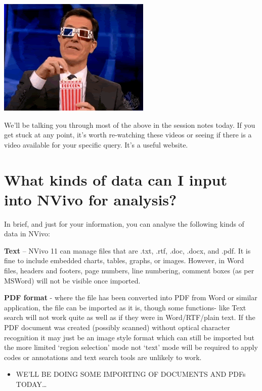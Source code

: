 \documentclass[
]{book}
\providecommand{\tightlist}{%
  \setlength{\itemsep}{0pt}\setlength{\parskip}{0pt}}
\begin{document}
\includegraphics{imgs/popcorn.gif}

We'll be talking you through most of the above in the session notes today. If you get stuck at any point, it's worth re-watching these videos or seeing if there is a video available for your specific query. It's a useful website.

\hypertarget{what-kinds-of-data-can-i-input-into-nvivo-for-analysis}{%
\section{What kinds of data can I input into NVivo for analysis?}\label{what-kinds-of-data-can-i-input-into-nvivo-for-analysis}}

In brief, and just for your information, you can analyse the following kinds of data in NVivo:

\textbf{Text} -- NVivo 11 can manage files that are .txt, .rtf, .doc, .docx, and .pdf. It is fine to include embedded charts, tables, graphs, or images. However, in Word files, headers and footers, page numbers, line numbering, comment boxes (as per MSWord) will not be visible once imported.

\textbf{PDF format} - where the file has been converted into PDF from Word or similar application, the file can be imported as it is, though some functions- like Text search will not work quite as well as if they were in Word/RTF/plain text. If the PDF document was created (possibly scanned) without optical character recognition it may just be an image style format which can still be imported but the more limited `region selection' mode not `text' mode will be required to apply codes or annotations and text search tools are unlikely to work.

\begin{itemize}
\tightlist
\item
  WE'LL BE DOING SOME IMPORTING OF DOCUMENTS AND PDFs TODAY\ldots{}
\end{itemize}
\end{document}
